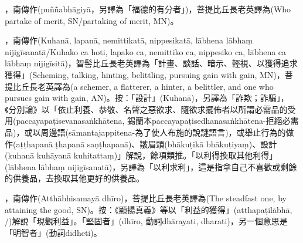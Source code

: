 \startitemgroup[noteitems]
\item{}，南傳作(puññabhāgiyā，另譯為「福德的有分者」)，菩提比丘長老英譯為(Who partake of merit, SN/partaking of merit, MN)。
\stopitemgroup

\startitemgroup[noteitems]
\item{}，南傳作(Kuhanā, lapanā, nemittikatā, nippesikatā, lābhena lābhaṃ nijigīsanatā/Kuhako ca hoti, lapako ca, nemittiko ca, nippesiko ca, lābhena ca lābhaṃ nijigīsitā)，智髻比丘長老英譯為「計畫、談話、暗示、輕視、以獲得追求獲得」(Scheming, talking, hinting, belittling, pursuing gain with gain, MN)，菩提比丘長老英譯為(a schemer, a flatterer, a hinter, a belittler, and one who pursues gain with gain, AN)。按：「設計」(Kuhanā)，另譯為「詐欺；詐騙」，《分別論》以「依止利養、恭敬、名聲之惡欲求、隨欲求擺佈者以所謂必需品的受用(paccayapaṭisevanasaṅkhātena, 錫蘭本paccayapaṭisedhanasaṅkhātena-拒絕必需品)，或以周邊語(sāmantajappitena-為了使人布施的說謎語言)，或舉止行為的做作(aṭṭhapanā ṭhapanā saṇṭhapanā)、皺眉頭(bhākuṭikā bhākuṭiyaṃ)、設計(kuhanā kuhāyanā kuhitattaṃ)」解說，餘項類推。「以利得換取其他利得」(lābhena lābhaṃ nijigīsanatā)，另譯為「以利求利」，這是指拿自己不喜歡或剩餘的供養品，去換取其他更好的供養品。
\stopitemgroup

\startitemgroup[noteitems]
\item{}，南傳作(Atthābhisamayā dhīro)，菩提比丘長老英譯為(The steadfast one, by attaining the good, SN)。按：《顯揚真義》等以「利益的獲得」(atthapaṭilābhā, /)解說「現觀利益」。「堅固者」(dhīro, 動詞dhārayati, dharati)，另一個意思是「明智者」(動詞dīdheti)。
\stopitemgroup

